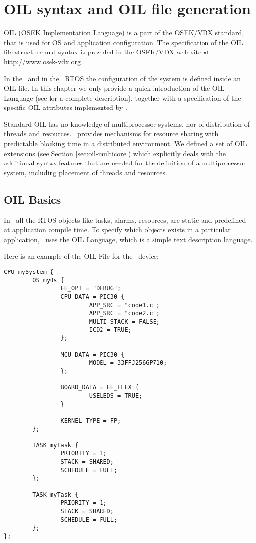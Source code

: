 \chapter{OIL syntax and OIL file generation}
\label{cha:oil-syntax}

OIL (OSEK Implementation Language) is a part of the OSEK/VDX standard,
that is used for OS and application configuration. The specification
of the OIL file structure and syntax is provided in the OSEK/VDX web
site at \url{http://www.osek-vdx.org} \cite{OSEKOIL}.

In the \rtd\ and in the \ee\ RTOS the configuration of the system is
defined inside an OIL file. In this chapter we only provide a quick
introduction of the OIL Language (see \cite{OSEKOIL} for a complete
description), together with a specification of the specific OIL
attributes implemented by \rtd.

Standard OIL has no knowledge of multiprocessor systems, nor of 
distribution of threads and resources. \ee\ provides mechanisms for 
resource sharing with predictable blocking time in a distributed 
environment. We defined a set of OIL extensions (see Section 
\ref{sec:oil-multicore}) which explicitly deals with the additional 
syntax features that are needed for the definition of a multiprocessor 
system, including placement of threads and resources. 

\section{OIL Basics}

In \ee\ all the RTOS objects like tasks, alarms, resources, are static
and predefined at application compile time. To specify which objects
exists in a particular application, \ee\ uses the OIL Language, which
is a simple text description language.

Here is an example of the OIL File for the \dspic\ device:

\begin{lstlisting}
CPU mySystem {
        OS myOs {
                EE_OPT = "DEBUG";
                CPU_DATA = PIC30 {
                        APP_SRC = "code1.c";
                        APP_SRC = "code2.c";
                        MULTI_STACK = FALSE;
                        ICD2 = TRUE;
                };

                MCU_DATA = PIC30 {
                        MODEL = 33FFJ256GP710;
                };

                BOARD_DATA = EE_FLEX {
                        USELEDS = TRUE;
                }

                KERNEL_TYPE = FP;
        };

        TASK myTask {
                PRIORITY = 1;
                STACK = SHARED;
                SCHEDULE = FULL;
        };

        TASK myTask {
                PRIORITY = 1;
                STACK = SHARED;
                SCHEDULE = FULL;
        };
};
\end{lstlisting}

